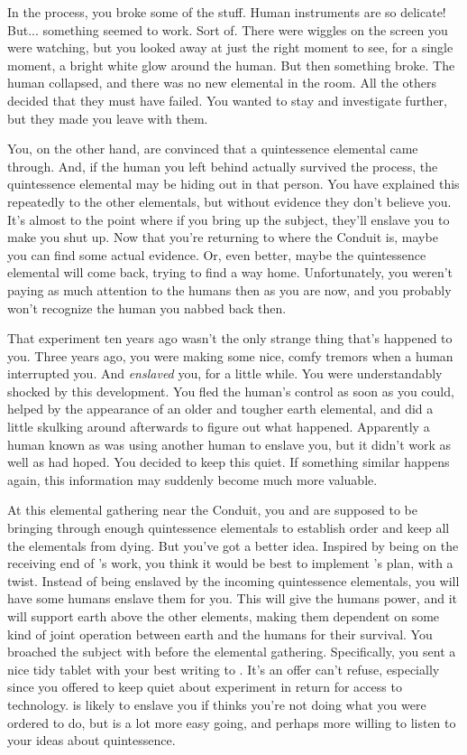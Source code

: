 \documentclass[char]{elementals}
\begin{document}
In the process, you broke some of the stuff.  Human instruments are so delicate!  But... something seemed to work.  Sort of.  There were wiggles on the screen you were watching, but you looked away at just the right moment to see, for a single moment, a bright white glow around the human.  But then something broke.  The human collapsed, and there was no new elemental in the room.  All the others decided that they must have failed.  You wanted to stay and investigate further, but they made you leave with them.

You, on the other hand, are convinced that a quintessence elemental came through.  And, if the human you left behind actually survived the process, the quintessence elemental may be hiding out in that person.  You have explained this repeatedly to the other elementals, but without evidence they don't believe you.  It's almost to the point where if you bring up the subject, they'll enslave you to make you shut up.  Now that you're returning to where the Conduit is, maybe you can find some actual evidence.  Or, even better, maybe the quintessence elemental will come back, trying to find a way home.  Unfortunately, you weren't paying as much attention to the humans then as you are now, and you probably won't recognize the human you nabbed back then.

That experiment ten years ago wasn't the only strange thing that's happened to you.  Three years ago, you were making some nice, comfy tremors when a human interrupted you.  And {\em enslaved} you, for a little while.  You were understandably shocked by this development.  You fled the human's control as soon as you could, helped by the appearance of an older and tougher earth elemental, and did a little skulking around afterwards to figure out what happened.  Apparently a human known as \cMS{\intro} was using another human to enslave you, but it didn't work as well as \cMS{\they} had hoped.  You decided to keep this quiet.  If something similar happens again, this information may suddenly become much more valuable.

At this elemental gathering near the Conduit, you and \cLoyal{} are supposed to be bringing through enough quintessence elementals to establish order and keep all the elementals from dying.  But you've got a better idea.  Inspired by being on the receiving end of \cMS{}'s work, you think it would be best to implement \cLoyal{}'s plan, with a twist.  Instead of being enslaved by the incoming quintessence elementals, you will have some humans enslave them for you.  This will give the humans power, and it will support earth above the other elements, making them dependent on some kind of joint operation between earth and the humans for their survival.  You broached the subject with \cMS{} before the elemental gathering.  Specifically, you sent a nice tidy tablet with your best writing to \cMS{\them}.  It's an offer \cMS{} can't refuse, especially since you offered to keep quiet about \cMS{\their} experiment in return for access to \cMS{\their} technology.  \cLoyal{} is likely to enslave you if  thinks you're not doing what you were ordered to do, but \cRogue{} is a lot more easy going, and perhaps more willing to listen to your ideas about quintessence.
\end{document}
